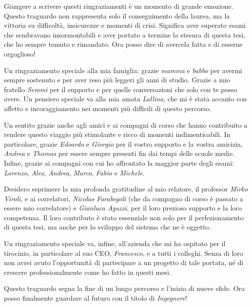 \begin{acknowledgements}
  Giungere a scrivere questi ringraziamenti è un momento di grande emozione. Questo traguardo non rappresenta solo il conseguimento della laurea, ma la vittoria su difficoltà, insicurezze e momenti di crisi. Significa aver superato esami che sembravano insormontabili e aver portato a termine la stesura di questa tesi, che ho sempre temuto e rimandato. Ora posso dire di avercela fatta e di esserne orgoglioso!

  Un ringraziamento speciale alla mia famiglia: grazie \emph{mamma} e \emph{babbo} per avermi sempre sostenuto e per aver reso più leggeri gli anni di studio. Grazie a mio fratello \emph{Semmi} per il supporto e per quelle conversazioni che solo con te posso avere. Un pensiero speciale va alla mia amata \emph{Lallina}, che mi è stata accanto con affetto e incoraggiamento nei momenti più difficili di questo percorso.

  Un sentito grazie anche agli amici e ai compagni di corso che hanno contribuito a rendere questo viaggio più stimolante e ricco di momenti indimenticabili. In particolare, grazie \emph{Edoardo} e \emph{Giorgio} per il vostro supporto e la vostra amicizia, \emph{Andrea} e \emph{Thomas} per essere sempre presenti fin dai tempi delle scuole medie. Infine, grazie ai compagni con cui ho affrontato la maggior parte degli esami: \emph{Lorenzo}, \emph{Alex}, \emph{Andrea}, \emph{Marco}, \emph{Fabio} e \emph{Michele}.

  Desidero esprimere la mia profonda gratitudine al mio relatore, il professor \emph{Mirko Viroli}, e ai correlatori, \emph{Nicolas Farabegoli} (che da compagno di corso è passato a essere mio correlatore) e \emph{Gianluca Aguzzi}, per il loro prezioso supporto e la loro competenza. Il loro contributo è stato essenziale non solo per il perfezionamento di questa tesi, ma anche per lo sviluppo del sistema che ne è oggetto.

  Un ringraziamento speciale va, infine, all'azienda che mi ha ospitato per il tirocinio, in particolare al suo CEO, \emph{Francesco}, e a tutti i colleghi. Senza di loro non avrei avuto l'opportunità di partecipare a un progetto di tale portata, né di crescere professionalmente come ho fatto in questi mesi.

  Questo traguardo segna la fine di un lungo percorso e l’inizio di nuove sfide. Ora posso finalmente guardare al futuro con il titolo di \textit{Ingegnere}!
\end{acknowledgements}
